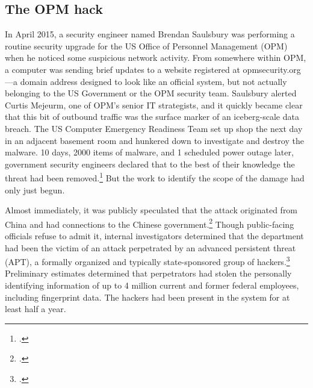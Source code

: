 \documentclass{report}
\begin{document}
\begin{refsegment}

\section{The OPM hack}
In April 2015, a security engineer named Brendan Saulsbury was performing a routine security upgrade for the US Office of Personnel Management (OPM) when he noticed some suspicious network activity. From somewhere within OPM, a computer was sending brief updates to a website registered at opmsecurity.org---a domain address designed to look like an official system, but not actually belonging to the US Government or the OPM security team. Saulsbury alerted Curtis Mejeurm, one of OPM's senior IT strategists, and it quickly became clear that this bit of outbound traffic was the surface marker of an iceberg-scale data breach. The US Computer Emergency Readiness Team set up shop the next day in an adjacent basement room and hunkered down to investigate and destroy the malware. 10 days, 2000 items of malware, and 1 scheduled power outage later, government security engineers declared that to the best of their knowledge the threat had been removed.\footcite{koerner_inside_2016} But the work to identify the scope of the damage had only just begun.

Almost immediately, it was publicly speculated that the attack originated from China and had connections to the Chinese government.\footcite{spetalnick_china_2015} Though public-facing officials refuse to admit it, internal investigators determined that the department had been the victim of an attack perpetrated by an advanced persistent threat (APT), a formally organized and typically state-sponsored group of hackers.\footcite[Attributing a cyberattack is difficult because hackers have endless means to obscure their orgins. In this case, however, the first clue that investigators found was left there on purpose. A particularly effective group of hackers tied to China has made it a calling card of sorts to register sites using the names of members of Marvel's comic book superhero group, The Avengers. In this case, opmsecurity.org was registered under the name "Steve Rogers," better known as Captain America.]{koerner_inside_2016} Preliminary estimates determined that perpetrators had stolen the personally identifying information of up to 4 million current and former federal employees, including fingerprint data. The hackers had been present in the system for at least half a year.


\end{refsegment}
\end{document}
